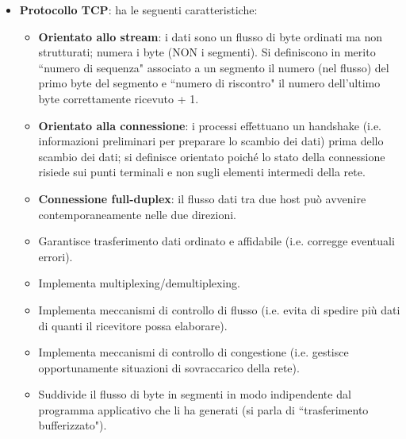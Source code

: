 \documentclass[11pt, italian, openany]{book}
\begin{document}
\begin{sloppypar}
\begin{itemize}[topsep=0pt]
	\item \textbf{Protocollo TCP}: ha le seguenti caratteristiche:
	\vspace{-3.5mm}
	\begin{itemize}
		\itemsep-0.3em
		\item \textbf{Orientato allo stream}: i dati sono un flusso di byte ordinati ma non strutturati; numera i byte (NON i segmenti). Si
		definiscono in merito ``numero di sequenza" associato a un segmento il numero (nel flusso) del primo byte del segmento e ``numero di
		riscontro" il numero dell'ultimo byte correttamente ricevuto + 1.
		\item \textbf{Orientato alla connessione}: i processi effettuano un handshake (i.e. informazioni preliminari per preparare lo scambio
		dei dati) prima dello scambio dei dati; si definisce orientato poich\'e lo stato della connessione risiede sui punti terminali e non
		sugli elementi intermedi della rete.
		\item \textbf{Connessione full-duplex}: il flusso dati tra due host pu\`o avvenire contemporaneamente nelle due direzioni.
		\item Garantisce trasferimento dati ordinato e affidabile (i.e. corregge eventuali errori).
		\item Implementa multiplexing/demultiplexing.
		\item Implementa meccanismi di controllo di flusso (i.e. evita di spedire pi\`u dati di quanti il ricevitore possa elaborare).
		\item Implementa meccanismi di controllo di congestione (i.e. gestisce opportunamente situazioni di sovraccarico della rete).
		\item Suddivide il flusso di byte in segmenti in modo indipendente dal programma applicativo che li ha generati (si parla di ``trasferimento
		bufferizzato").
	\end{itemize}


\end{itemize}
\end{sloppypar}
\end{document}
